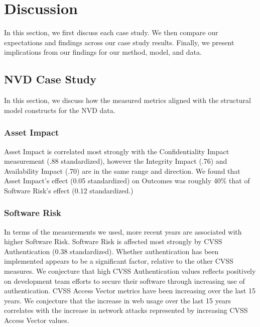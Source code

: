 \section{Discussion}
\label{sec:discussion}

In this section, we first discuss each case study. We then compare our expectations and findings across our case study results. Finally, we present implications from our findings for our method, model, and data. 

\subsection{NVD Case Study}
\label{sec:case_nvd_discussion}
In this section, we discuss how the measured metrics aligned with the structural model constructs for the NVD data.

\subsubsection{Asset Impact}
Asset Impact is correlated most strongly with the Confidentiality Impact measurement (.88 standardized), however the Integrity Impact (.76) and Availability Impact (.70) are in the same range and direction.
We found that Asset Impact's effect (0.05 standardized) on Outcomes was roughly 40\% that of Software Risk's effect (0.12 standardized.)

\subsubsection{Software Risk}
In terms of the measurements we used, more recent years are associated with higher Software Risk. Software Risk is affected most strongly by CVSS Authentication (0.38 standardized). Whether authentication has been implemented appears to be a significant factor, relative to the other CVSS measures. We conjecture that high CVSS Authentication values reflects positively on development team efforts to secure their software through increasing use of authentication. CVSS Access Vector metrics have been increasing over the last 15 years.  We conjecture that the increase in web usage over the last 15 years correlates with the increase in network attacks represented by increasing CVSS Access Vector values.

